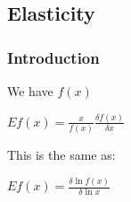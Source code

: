 
\subsection{Elasticity}

\subsubsection{Introduction}

We have \(f(x)\)

\(Ef(x)=\frac{x}{f(x)}\frac{\delta f(x)}{\delta x}\)

This is the same as:

\(Ef(x)=\frac{\delta \ln f(x)}{\delta \ln x}\)

